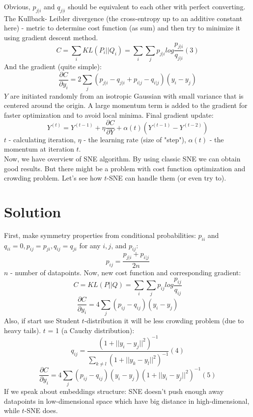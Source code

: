 Obvious, $p_{j|i}$ and $q_{j|i}$ should be equivalent to each other with perfect converting. The Kullback-
Leibler divergence (the cross-entropy up to an additive constant here) - metric to determine cost function (as sum) and then try to minimize it using gradient descent method.
$$ C = \sum_i{KL(P_i||Q_i)} = \sum_i{\sum_j{p_{j|i}log{\frac{p_{j|i}}{q_{j|i}}}}} (3) $$
And the gradient (quite simple):
$$ \frac{\partial C}{\partial y_i} = 2 \sum_j{(p_{j|i} - q_{j|i} + p_{i|j} - q_{i|j})(y_i - y_j)} $$
$Y$ are initiated randomly from an isotropic Gaussian with small variance that is centered around the origin. A large momentum term is added to the gradient for faster optimization and to avoid local minima. Final gradient update:
$$ Y^{(t)} = Y^{(t-1)} + \eta \frac{\partial C}{\partial Y} + \alpha(t)(Y^{(t-1)} - Y^{(t-2)})$$
$t$ - calculating iteration, $\eta$ - the learning rate (size of "step"), $\alpha(t)$ - the momentum at iteration $t$.\\

Now, we have overview of SNE algorithm. By using classic SNE we can obtain good results. But there might be a problem with cost function optimization and crowding problem. Let's see how $t$-SNE can handle them (or even try to).

\section{Solution}

First, make symmetry properties from conditional probabilities: $p_{ii}$ and $q_{ii} = 0, p_{ij} = p_{ji}, q_{ij} = q_{ji}$ for any $i, j$, and $p_{ij}$:
$$ p_{ij} = \frac{p_{j|i} + p_{i|j}}{2n} $$
$n$ - number of datapoints. Now, new cost function and corresponding gradient:
$$ C = KL(P||Q) = \sum_i{\sum_j{p_{ij}log{\frac{p_{ij}}{q_{ij}}}}} $$
$$ \frac{\partial C}{\partial y_i} = 4 \sum_j{(p_{ij} - q_{ij})(y_i - y_j)} $$
Also, if start use Student $t$-distribution it will be less crowding problem (due to heavy tails). $t$ = 1 (a Cauchy distribution):
$$ q_{ij} = \frac{(1 + ||y_i - y_j||^2)^{-1}}{\sum_{k \ne l}{(1 + ||y_k - y_l||^2)^{-1}}} (4) $$
$$ \frac{\partial C}{\partial y_i} = 4 \sum_j{(p_{ij} - q_{ij})(y_i - y_j)(1 + ||y_i - y_j||^2)^{-1}} (5) $$
If we speak about embeddings structure: SNE doesn't push enough away datapoints in low-dimensional space which have big distance in high-dimensional, while $t$-SNE does.\\

